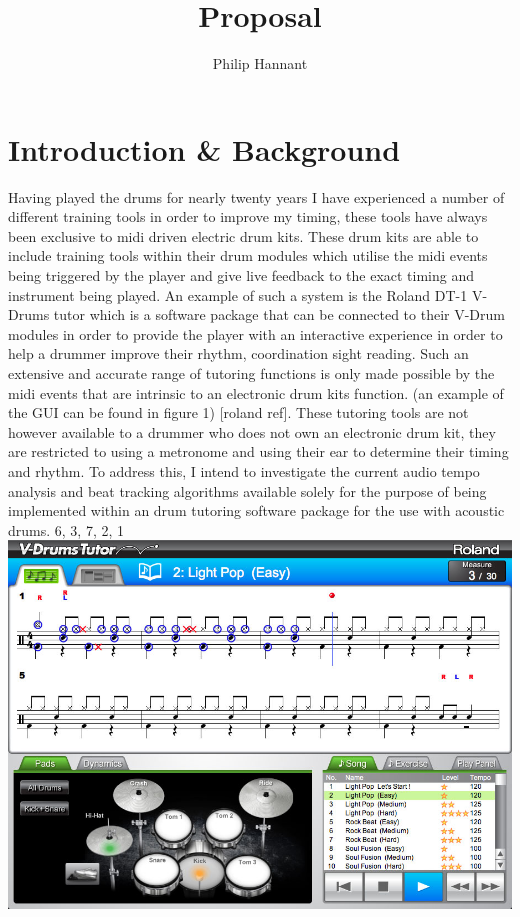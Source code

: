\documentclass[a4paper, 11pt]{article}
\title{Proposal} \author{Philip Hannant}
\begin{document}
 \maketitle{} \section{Introduction \& Background}



Having played the drums for nearly twenty years I have experienced a number of different training tools in order to improve my timing, these tools have always been exclusive to midi driven electric drum kits. These drum kits are able to include training tools within their drum modules which utilise the midi events being triggered by the player and give live feedback to the exact timing and instrument being played. An example of such a system is the Roland DT-1 V-Drums tutor which is a software package that can be connected to their V-Drum modules in order to provide the player with an interactive experience in order to help a drummer improve their rhythm, coordination sight reading. Such an extensive and accurate range of tutoring functions is only made possible by the midi events that are intrinsic to an electronic drum kits function. (an example of the GUI can be found in figure 1) [roland ref]. These tutoring tools are not however available to a drummer who does not own an electronic drum kit, they are restricted to using a metronome and using their ear to determine their timing and rhythm. To address this, I intend to investigate the current audio tempo analysis and beat tracking algorithms available solely for the purpose of being implemented within an drum tutoring software package for the use with acoustic drums.
6, 3, 7, 2, 1
\includegraphics[scale=0.2]{dt-1_ss_main_notation_gal} 
\end{document}
